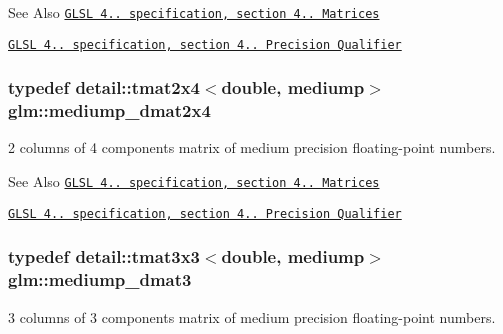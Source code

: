 \begin{DoxySeeAlso}{See Also}
\href{http://www.opengl.org/registry/doc/GLSLangSpec.4.20.8.pdf}{\tt G\-L\-S\-L 4.. specification, section 4.. Matrices} 

\href{http://www.opengl.org/registry/doc/GLSLangSpec.4.20.8.pdf}{\tt G\-L\-S\-L 4.. specification, section 4.. Precision Qualifier} 
\end{DoxySeeAlso}
\hypertarget{group__core__precision_gadb60bf60ef2b8da4a28a372b2bcca3a3}{
\subsubsection[{mediump\-\_\-dmat2x4}]{\setlength{\rightskip}{0pt plus 5cm}typedef detail\-::tmat2x4$<$double, mediump$>$ {\bf glm\-::mediump\-\_\-dmat2x4}}}\label{group__core__precision_gadb60bf60ef2b8da4a28a372b2bcca3a3}
2 columns of 4 components matrix of medium precision floating-\/point numbers.

\begin{DoxySeeAlso}{See Also}
\href{http://www.opengl.org/registry/doc/GLSLangSpec.4.20.8.pdf}{\tt G\-L\-S\-L 4.. specification, section 4.. Matrices} 

\href{http://www.opengl.org/registry/doc/GLSLangSpec.4.20.8.pdf}{\tt G\-L\-S\-L 4.. specification, section 4.. Precision Qualifier} 
\end{DoxySeeAlso}
\hypertarget{group__core__precision_ga80600af2c1ca11ead6123777185c372d}{
\subsubsection[{mediump\-\_\-dmat3}]{\setlength{\rightskip}{0pt plus 5cm}typedef detail\-::tmat3x3$<$double, mediump$>$ {\bf glm\-::mediump\-\_\-dmat3}}}\label{group__core__precision_ga80600af2c1ca11ead6123777185c372d}
3 columns of 3 components matrix of medium precision floating-\/point numbers.

